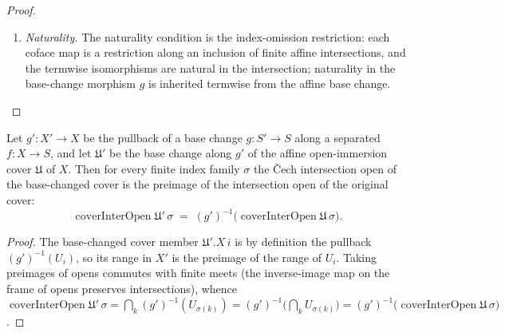 \begin{proof}
\begin{enumerate}
      \cref{lem:cech_degree_affine_baseChange}), assembled from the concrete tilde
      dictionaries \cref{lem:pushforward_spec_tilde_iso} and
      \cref{lem:pullback_spec_tilde_iso} with the commutative-algebra cancellation
      \(\operatorname{cancelBaseChange}\) (\cref{lem:cancelBaseChange_mathlib}) --- not the
      canonical adjoint mate.
    \item \emph{Naturality.} The naturality condition is the index-omission
      restriction: each coface map is a restriction along an inclusion of finite affine
      intersections, and the termwise isomorphisms are natural in the intersection;
      naturality in the base-change morphism \(g\) is inherited termwise from the affine
      base change.
  \end{enumerate}
\end{proof}

\begin{lemma}

  \label{lem:coverinteropen_basechange_eq}
  Let \(g' : X' \to X\) be the pullback of a base change \(g : S' \to S\) along a separated
  \(f : X \to S\), and let \(\mathfrak{U}'\) be the base change along \(g'\) of the affine
  open-immersion cover \(\mathfrak{U}\) of \(X\). Then for every finite index family
  \(\sigma\) the {\v C}ech intersection open of the base-changed cover is the preimage of the
  intersection open of the original cover:
  \[
    \operatorname{coverInterOpen}\mathfrak{U}'\,\sigma
      \;=\; (g')^{-1}\bigl(\operatorname{coverInterOpen}\mathfrak{U}\,\sigma\bigr).
  \]
\end{lemma}
\begin{proof}
  The base-changed cover member \(\mathfrak{U}'.X\,i\) is by definition the pullback
  \((g')^{-1}(U_i)\), so its range in \(X'\) is the preimage of the range of \(U_i\). Taking
  preimages of opens commutes with finite meets (the inverse-image map on the frame of opens
  preserves intersections), whence
  \(\operatorname{coverInterOpen}\mathfrak{U}'\,\sigma = \bigcap_k (g')^{-1}(U_{\sigma(k)})
  = (g')^{-1}\bigl(\bigcap_k U_{\sigma(k)}\bigr)
  = (g')^{-1}\bigl(\operatorname{coverInterOpen}\mathfrak{U}\,\sigma\bigr)\).
\end{proof}

